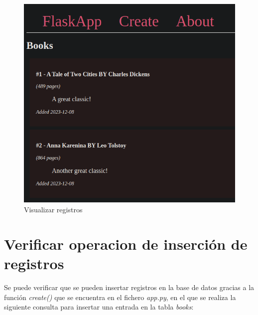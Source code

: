 \documentclass[11pt]{report}
\begin{document}
\begin{figure}[H]
  \centering
  \includegraphics[scale=0.35]{img/visualizar_registros.png}
  \caption{Visualizar registros}
  \label{fig:visualizar_registros}
\end{figure}

\cleardoublepage

\section{Verificar operacion de inserción de registros}
Se puede verificar que se pueden insertar registros en la base de datos gracias a la función \emph{create()} que
se encuentra en el fichero \emph{app.py}, en el que se realiza la siguiente consulta para insertar una entrada
en la tabla \emph{books}:
\lstset{style=mystyle}

\end{document}
